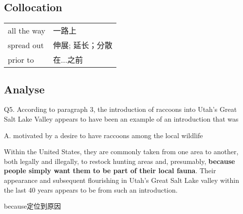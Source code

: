 \subsection{Collocation}

\begin{tabular}{ll}
    all the way & 一路上       \\
    spread out  & 伸展; 延长；分散 \\
    prior to    & 在...之前    \\
\end{tabular}

\newpage

\subsection{Analyse}

\begin{blk}
    \begin{qst}
        Q5. According to paragraph 3, the introduction of raccoons into Utah’s Great Salt Lake Valley appears to have been an example of an introduction that was
    \end{qst}

    \begin{chc}
        A. motivated by a desire to have raccoons among the local wildlife
    \end{chc}

    \begin{psgq}
        Within the United States, they are commonly taken from one area to another, both legally and illegally, to restock hunting areas and, presumably, \textbf{because people simply want them to be part of their local fauna}. Their appearance and subsequent flourishing in Utah’s Great Salt Lake valley within the last 40 years appears to be from such an introduction.
    \end{psgq}

    \begin{nlz}
        because定位到原因
    \end{nlz}
\end{blk}

